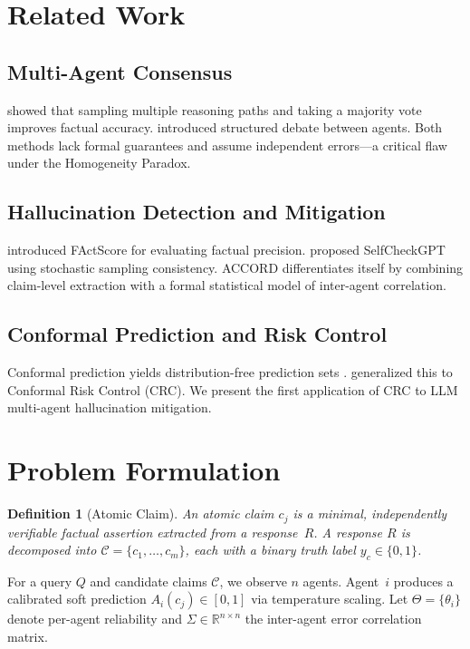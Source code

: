 \documentclass[conference]{IEEEtran}
\newtheorem{definition}{Definition}
\begin{document}
\section{Related Work}

\subsection{Multi-Agent Consensus}
\citet{wang2022selfconsistency} showed that sampling multiple reasoning paths and taking a majority vote improves factual accuracy. \citet{du2023debate} introduced structured debate between agents. Both methods lack formal guarantees and assume independent errors—a critical flaw under the Homogeneity Paradox.

\subsection{Hallucination Detection and Mitigation}
\citet{min2023factscore} introduced FActScore for evaluating factual precision. \citet{manakul2023selfcheckgpt} proposed SelfCheckGPT using stochastic sampling consistency. ACCORD differentiates itself by combining claim-level extraction with a formal statistical model of inter-agent correlation.

\subsection{Conformal Prediction and Risk Control}
Conformal prediction yields distribution-free prediction sets \cite{vovk2005}. \citet{angelopoulos2022crc} generalized this to Conformal Risk Control (CRC). We present the first application of CRC to LLM multi-agent hallucination mitigation.

\section{Problem Formulation}

\begin{definition}[Atomic Claim]
An \emph{atomic claim} $c_j$ is a minimal, independently verifiable factual assertion extracted from a response~$R$. A response $R$ is decomposed into $\mathcal{C} = \{c_1, \ldots, c_m\}$, each with a binary truth label $y_c \in \{0, 1\}$.
\end{definition}

For a query $Q$ and candidate claims $\mathcal{C}$, we observe $n$ agents. Agent~$i$ produces a calibrated soft prediction $A_i(c_j) \in [0,1]$ via temperature scaling. Let $\Theta = \{\theta_i\}$ denote per-agent reliability and $\Sigma \in \mathbb{R}^{n \times n}$ the inter-agent error correlation matrix.
\end{document}
